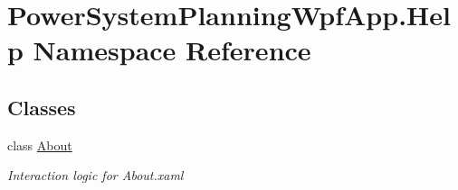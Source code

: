 \hypertarget{namespace_power_system_planning_wpf_app_1_1_help}{}\section{Power\+System\+Planning\+Wpf\+App.\+Help Namespace Reference}
\label{namespace_power_system_planning_wpf_app_1_1_help}
\subsection*{Classes}
\begin{DoxyCompactItemize}
\item 
class \hyperlink{class_power_system_planning_wpf_app_1_1_help_1_1_about}{About}
\begin{DoxyCompactList}\small\item\em Interaction logic for About.\+xaml \end{DoxyCompactList}\end{DoxyCompactItemize}
